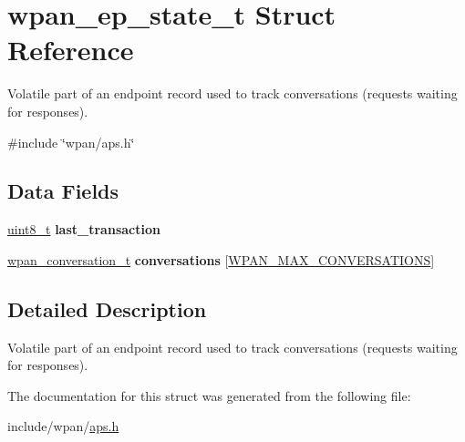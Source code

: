 \hypertarget{structwpan__ep__state__t}{}\section{wpan\+\_\+ep\+\_\+state\+\_\+t Struct Reference}
\label{structwpan__ep__state__t}


Volatile part of an endpoint record used to track conversations (requests waiting for responses).  




{\ttfamily \#include \char`\"{}wpan/aps.\+h\char`\"{}}

\subsection*{Data Fields}
\begin{DoxyCompactItemize}
\item 
\hyperlink{group__hal__dos_gae1affc9ca37cfb624959c866a73f83c2}{uint8\+\_\+t} {\bfseries last\+\_\+transaction}
\item 
\hyperlink{structwpan__conversation__t}{wpan\+\_\+conversation\+\_\+t} {\bfseries conversations} \mbox{[}\hyperlink{group__wpan__aps_gae34b1efc8ba99add17fcd767852197d4}{W\+P\+A\+N\+\_\+\+M\+A\+X\+\_\+\+C\+O\+N\+V\+E\+R\+S\+A\+T\+I\+O\+NS}\mbox{]}
\end{DoxyCompactItemize}


\subsection{Detailed Description}
Volatile part of an endpoint record used to track conversations (requests waiting for responses). 



The documentation for this struct was generated from the following file\+:\begin{DoxyCompactItemize}
\item 
include/wpan/\hyperlink{aps_8h}{aps.\+h}\end{DoxyCompactItemize}
